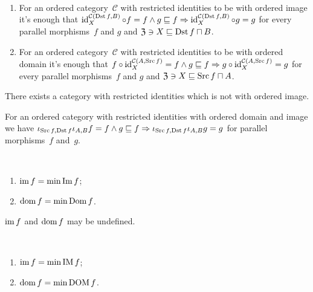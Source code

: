 \begin{obvious}
~
\begin{enumerate}
\item For an ordered category~$\mathcal{C}$ with restricted identities
to be with ordered image it's enough that
$\operatorname{id}^{\mathcal{C}(\operatorname{Dst} f,B)}_X\circ f=f\land
g\sqsubseteq f\Rightarrow
\operatorname{id}^{\mathcal{C}(\operatorname{Dst} f,B)}_X\circ g=g$
for every parallel morphisms~$f$ and $g$ and
$\mathfrak{Z}\ni X\sqsubseteq\operatorname{Dst} f\sqcap B$.
\item For an ordered category~$\mathcal{C}$ with restricted identities
to be with ordered domain it's enough that
$f\circ\operatorname{id}^{\mathcal{C}(A,\operatorname{Src} f)}_X=f\land
g\sqsubseteq f\Rightarrow
g\circ\operatorname{id}^{\mathcal{C}(A,\operatorname{Src} f)}_X=g$
for every parallel morphisms~$f$ and $g$ and
$\mathfrak{Z}\ni X\sqsubseteq\operatorname{Src} f\sqcap A$.
\end{enumerate}
\end{obvious}

\begin{conjecture}
There exists a category with restricted identities which
is not with ordered image.
\end{conjecture}

\begin{obvious}
For an ordered category with restricted identities with
ordered domain and image we have
$\iota_{\operatorname{Src} f,\operatorname{Dst} f}\iota_{A,B}f=f\land g\sqsubseteq f
\Rightarrow
\iota_{\operatorname{Src} f,\operatorname{Dst} f}\iota_{A,B}g=g$
for parallel morphisms~$f$ and~$g$.
\end{obvious}

\begin{defn}
~
\begin{enumerate}
\item $\operatorname{im} f = \min\operatorname{Im} f$;
\item $\operatorname{dom} f = \min\operatorname{Dom} f$.
\end{enumerate}
\end{defn}

\begin{note}
$\operatorname{im} f$ and $\operatorname{dom} f$ may be undefined.
\end{note}

\begin{prop}
~
\begin{enumerate}
\item $\operatorname{im} f = \min\operatorname{IM} f$;
\item $\operatorname{dom} f = \min\operatorname{DOM} f$.
\end{enumerate}
\end{prop}

